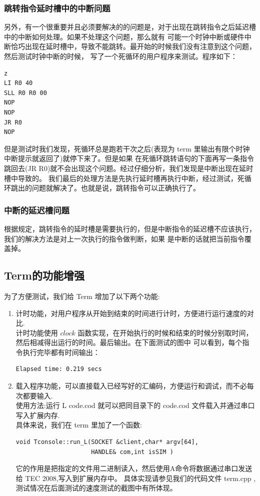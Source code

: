 \documentclass[10pt]{article}
\begin{document}
\begin{CJK}{UTF8}{gbsn}
\subsubsection{跳转指令延时槽中的中断问题}
另外，有一个很重要并且必须要解决的的问题是，对于出现在跳转指令之后延迟槽中的中断如何处理。如果不处理这个问题，那么就有
可能一个时钟中断或硬件中断恰巧出现在延时槽中，导致不能跳转。最开始的时候我们没有注意到这个问题，然后测试时钟中断的时候，
写了一个死循环的用户程序来测试。程序如下：\\
\begin{center}
\begin{verbatim}z
LI R0 40
SLL R0 R0 00
NOP
NOP
JR R0
NOP
\end{verbatim}
\end{center}

但是测试时我们发现，死循环总是跑若干次之后(表现为 term 里输出有限个时钟中断提示就返回了)就停下来了。但是如果
在死循环跳转语句的下面再写一条指令跳回去(JR R0)就不会出现这个问题。经过仔细分析，我们发现是中断出现在延时槽中导致的。
我们最后的处理方法是先执行延时槽再执行中断，经过测试，死循环跳出的问题就解决了。也就是说，跳转指令可以正确执行了。

\subsubsection{中断的延迟槽问题}
根据规定，跳转指令的延时槽是需要执行的，但是中断指令的延迟槽不应该执行，我们的解决方法是对上一次执行的指令做判断，如果
是中断的话就把当前指令覆盖掉。

\subsection{Term的功能增强}
为了方便测试，我们给 Term 增加了以下两个功能:\\
\begin{enumerate}
\item 计时功能，对用户程序从开始到结束的时间进行计时，方便进行运行速度的对比.\\
计时功能使用 $clock$ 函数实现，在开始执行的时候和结束的时候分别取时间，然后相减得出运行的时间。最后输出。在下面测试的图中
可以看到，每个指令执行完毕都有时间输出：
\begin{verbatim}
Elapsed time: 0.219 secs
\end{verbatim}
\item 载入程序功能，可以直接载入已经写好的汇编码，方便运行和调试，而不必每次都要输入.\\
使用方法:运行 L code.cod 就可以把同目录下的 code.cod 文件载入并通过串口写入扩展内存.\\
具体来说，我们在 term 里加了一个函数:\\
\begin{verbatim}
void Tconsole::run_L(SOCKET &client,char* argv[64],
                     HANDLE& com,int isSIM )
\end{verbatim}
它的作用是把指定的文件用二进制读入，然后使用A命令将数据通过串口发送给 TEC 2008,写入到扩展内存中。
具体实现请参见我们的代码文件 term.cpp , 测试情况在后面测试的速度测试的截图中有所体现。
\end{enumerate}


\end{CJK}
\end{document}
